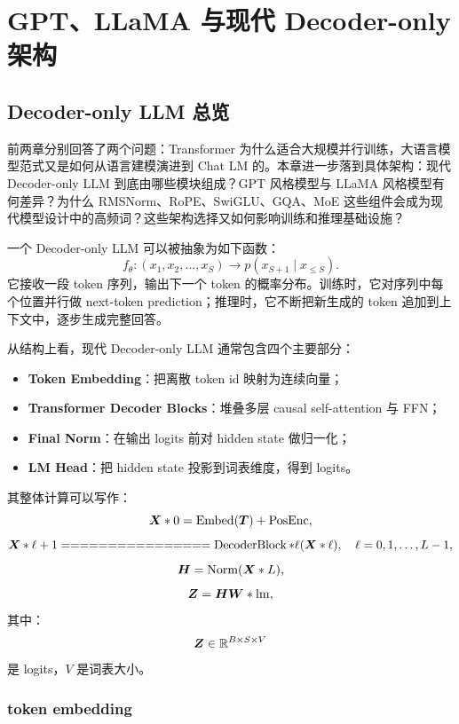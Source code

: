 \chapter{GPT、LLaMA 与现代 Decoder-only 架构}
\label{chap:gpt-llama-arch}

\section{Decoder-only LLM 总览}
\label{sec:decoder-only-llm-overview}

前两章分别回答了两个问题：Transformer 为什么适合大规模并行训练，大语言模型范式又是如何从语言建模演进到 Chat LM 的。本章进一步落到具体架构：现代 Decoder-only LLM 到底由哪些模块组成？GPT 风格模型与 LLaMA 风格模型有何差异？为什么 RMSNorm、RoPE、SwiGLU、GQA、MoE 这些组件会成为现代模型设计中的高频词？这些架构选择又如何影响训练和推理基础设施？

一个 Decoder-only LLM 可以被抽象为如下函数：
\[
f_{\theta}:
(x_1,x_2,\ldots,x_S)
\rightarrow
p(x_{S+1}\mid x_{\le S}).
\]
它接收一段 token 序列，输出下一个 token 的概率分布。训练时，它对序列中每个位置并行做 next-token prediction；推理时，它不断把新生成的 token 追加到上下文中，逐步生成完整回答。

从结构上看，现代 Decoder-only LLM 通常包含四个主要部分：

\begin{itemize}
\item \textbf{Token Embedding}：把离散 token id 映射为连续向量；
\item \textbf{Transformer Decoder Blocks}：堆叠多层 causal self-attention 与 FFN；
\item \textbf{Final Norm}：在输出 logits 前对 hidden state 做归一化；
\item \textbf{LM Head}：把 hidden state 投影到词表维度，得到 logits。
\end{itemize}

其整体计算可以写作：
\[
\bm{X}*0=\operatorname{Embed}(\bm{T})+\operatorname{PosEnc},
\]
\[
\mat{X}*{\ell+1}
================

\operatorname{DecoderBlock}*{\ell}(\mat{X}*{\ell}),
\quad
\ell=0,1,\ldots,L-1,
\]
\[
\bm{H}=\operatorname{Norm}(\bm{X}*L),
\]
\[
\bm{Z}=\bm{H}\bm{W}*{\mathrm{lm}},
\]
其中：
\[
\bm{Z}\in\mathbb{R}^{B\times S\times V}
\]
是 logits，$V$ 是词表大小。

\subsection{token embedding}
\label{subsec:token-embedding}

